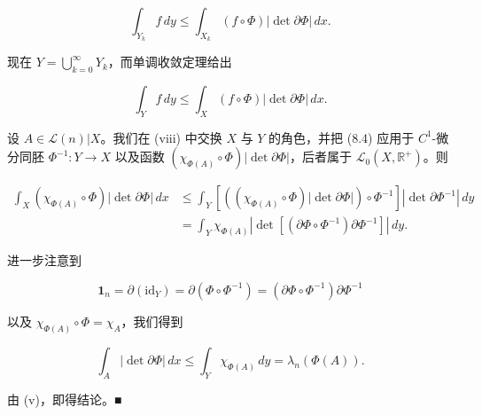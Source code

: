 \begin{proposition}
\begin{subitems}
\[
\int_{Y_{k}} f \, dy \le \int_{X_{k}} (f \circ \Phi)|\det \partial\Phi| \, dx .
\]

现在 $ Y = \bigcup_{k=0}^{\infty} Y_{k} $，而单调收敛定理给出

\begin{equation}
\int_{Y} f \, dy \le \int_{X} (f \circ \Phi)|\det \partial\Phi| \, dx .\tag{8.4}
\end{equation}
\item

设 $ A \in \mathcal{L}(n)|X $。我们在 (viii) 中交换 $ X $ 与 $ Y $ 的角色，并把 (8.4) 应用于 $ C^{1} $-微分同胚 $ \Phi^{-1} : Y \to X $ 以及函数 $ (\chi_{\Phi(A)} \circ \Phi)|\det \partial\Phi| $，后者属于 $ \mathcal{L}_{0}(X, \mathbb{R}^{+}) $。则

\begin{equation*}
\begin{aligned}
\int_{X} (\chi_{\Phi(A)} \circ \Phi)|\det \partial\Phi| \, dx &\le \int_{Y} \left[ ((\chi_{\Phi(A)} \circ \Phi)|\det \partial\Phi|) \circ \Phi^{-1} \right] |\det \partial\Phi^{-1}| \, dy \\ &= \int_{Y} \chi_{\Phi(A)} |\det[(\partial\Phi \circ \Phi^{-1})\partial\Phi^{-1}]| \, dy .
\end{aligned}
\end{equation*}

进一步注意到

\begin{equation}
\mathbf{1}_{n} = \partial(\mathrm{id}_{Y}) = \partial(\Phi \circ \Phi^{-1}) = (\partial\Phi \circ \Phi^{-1})\partial\Phi^{-1}\tag{8.5}
\end{equation}

以及 $ \chi_{\Phi(A)} \circ \Phi = \chi_{A} $，我们得到

\[
\int_{A} |\det \partial\Phi| \, dx \le \int_{Y} \chi_{\Phi(A)} \, dy = \lambda_{n}(\Phi(A)) .
\]

由 (v)，即得结论。\nobreak\hspace{0.35em}■

\end{subitems}

\end{proposition}

